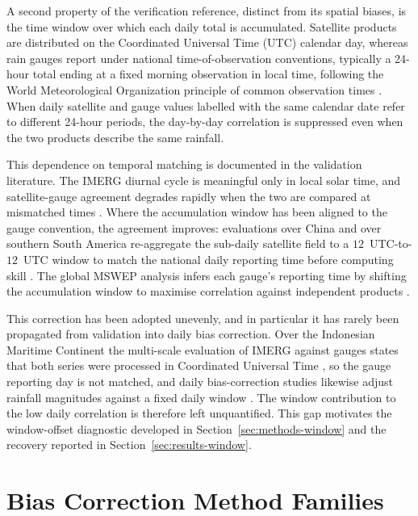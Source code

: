 A second property of the verification reference, distinct from its
spatial biases, is the time window over which each daily total is
accumulated. Satellite products are distributed on the Coordinated
Universal Time (UTC) calendar day, whereas rain gauges report under
national time-of-observation conventions, typically a 24-hour total
ending at a fixed morning observation in local time, following the
World Meteorological Organization principle of common observation
times \citep{ref:wmo2018no8}. When daily satellite and gauge values
labelled with the same calendar date refer to different 24-hour
periods, the day-by-day correlation is suppressed even when the two
products describe the same rainfall.

This dependence on temporal matching is documented in the
validation literature. The IMERG diurnal cycle is meaningful only
in local solar time, and satellite-gauge agreement degrades rapidly
when the two are compared at mismatched times \citep{ref:li2018, ref:tan2019}. Where the accumulation window has been aligned to the
gauge convention, the agreement improves: evaluations over China
and over southern South America re-aggregate the sub-daily satellite
field to a $12$~UTC-to-$12$~UTC window to match the national daily
reporting time before computing skill \citep{ref:salio2015, ref:xie2022}. The global MSWEP analysis infers each gauge's
reporting time by shifting the accumulation window to maximise
correlation against independent products \citep{ref:beck2019}.

This correction has been adopted unevenly, and in particular it has
rarely been propagated from validation into daily bias correction.
Over the Indonesian Maritime Continent the multi-scale evaluation of
IMERG against gauges states that both series were processed in
Coordinated Universal Time \citep{ref:ramadhan2022ts}, so the
gauge reporting day is not matched, and daily bias-correction
studies likewise adjust rainfall magnitudes against a fixed daily
window \citep{ref:ramadhan2024sumatra, ref:suhartanto2025, ref:wang2026}.
The window contribution to the low daily correlation is therefore
left unquantified. This
gap motivates the window-offset diagnostic developed in
Section~\ref{sec:methods-window} and the recovery reported in
Section~\ref{sec:results-window}.


\section{Bias Correction Method Families}\label{sec:lit-methods}

